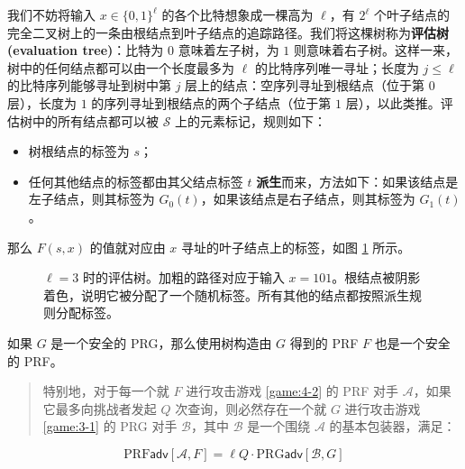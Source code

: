 我们不妨将输入 $x\in\{0,1\}^\ell$ 的各个比特想象成一棵高为 $\ell$，有 $2^\ell$ 个叶子结点的完全二叉树上的一条由根结点到叶子结点的追踪路径。我们将这棵树称为\textbf{评估树 (evaluation tree)}：比特为 $0$ 意味着左子树，为 $1$ 则意味着右子树。这样一来，树中的任何结点都可以由一个长度最多为 $\ell$ 的比特序列唯一寻址；长度为 $j\leq\ell$ 的比特序列能够寻址到树中第 $j$ 层上的结点：空序列寻址到根结点（位于第 $0$ 层），长度为 $1$ 的序列寻址到根结点的两个子结点（位于第 $1$ 层），以此类推。评估树中的所有结点都可以被 $\mathcal{S}$ 上的元素标记，规则如下：
\begin{itemize}
	\item 树根结点的标签为 $s$；
	\item 任何其他结点的标签都由其父结点标签 $t$ \textbf{派生}而来，方法如下：如果该结点是左子结点，则其标签为 $G_0(t)$，如果该结点是右子结点，则其标签为 $G_1(t)$。
\end{itemize}
那么 $F(s,x)$ 的值就对应由 $x$ 寻址的叶子结点上的标签，如图 \ref{fig:4-15} 所示。

\begin{figure}
  \centering
  
  \caption{$\ell=3$ 时的评估树。加粗的路径对应于输入 $x=101$。根结点被阴影着色，说明它被分配了一个随机标签。所有其他的结点都按照派生规则分配标签。}
  \label{fig:4-15}
\end{figure}

\begin{theorem}\label{theo:4-10}
如果 $G$ 是一个安全的 PRG，那么使用树构造由 $G$ 得到的 PRF $F$ 也是一个安全的 PRF。
\begin{quote}
特别地，对于每一个就 $F$ 进行攻击游戏 \ref{game:4-2} 的 PRF 对手 $\mathcal{A}$，如果它最多向挑战者发起 $Q$ 次查询，则必然存在一个就 $G$ 进行攻击游戏 \ref{game:3-1} 的 PRG 对手 $\mathcal{B}$，其中 $\mathcal{B}$ 是一个围绕 $\mathcal{A}$ 的基本包装器，满足：
\end{quote}
\[
\mathrm{PRF}\mathsf{adv}[\mathcal{A},F]
=\ell Q\cdot
\mathrm{PRG}\mathsf{adv}[\mathcal{B},G]
\]
\end{theorem}

